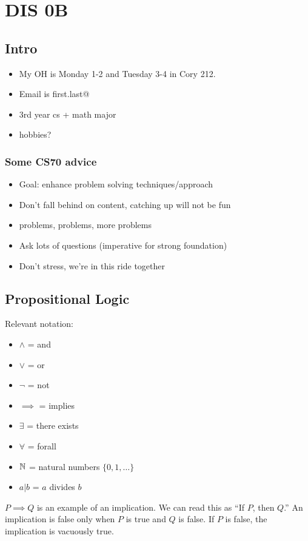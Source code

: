\section{DIS 0B}
\subsection{Intro}
\begin{itemize}
    \item My OH is Monday 1-2 and Tuesday 3-4 in Cory 212. 
    \item Email is first.last@
    \item 3rd year cs + math major 
    \item hobbies?
\end{itemize}

\subsubsection{Some CS70 advice}
\begin{itemize}
    \item Goal: enhance problem solving techniques/approach
    \item Don't fall behind on content, catching up will not be fun
    \item problems, problems, more problems
    \item Ask lots of questions (imperative for strong foundation)
    \item Don't stress, we're in this ride together
\end{itemize}

\subsection{Propositional Logic}
Relevant notation: \begin{itemize}
    \item $\land$ = and 
    \item $\lor$ = or 
    \item $\neg$ = not 
    \item $\implies$ = implies
    \item $\exists$ = there exists
    \item $\forall$ = forall
    \item $\operatorname{\mathbb{N}}$ = natural numbers $\{0, 1, \ldots \}$ 
    \item $a|b$ = $a$ divides $b$
\end{itemize}

$P \implies Q$ is an example of an implication. We can read this as ``If $P$, then $Q$.'' An implication is false only when $P$ is true and $Q$ is false. If $P$ is false, the implication is vacuously true. 

